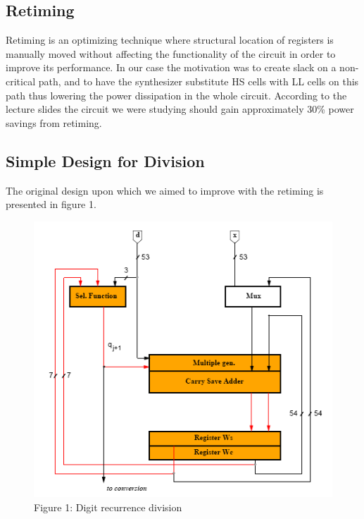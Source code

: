 \documentclass[11pt,a4paper]{article}
\begin{document}
\subsection{Retiming}
Retiming is an optimizing technique where structural location of registers is manually moved without affecting the functionality of the circuit in order to improve its performance. In our case the motivation was to create slack on a non-critical path, and to have the synthesizer substitute HS cells with LL cells on this path thus lowering the power dissipation in the whole circuit. According to the lecture slides the circuit we were studying should gain approximately 30\% power savings from retiming.

\subsection{Simple Design for Division}
The original design upon which we aimed to improve with the retiming is presented in figure 1.

\begin{figure}
	\centering
		\includegraphics{./noretiming.PNG}
	\caption{Figure 1: Digit recurrence division}
	\label{fig:noretiming}
\end{figure}
\end{document}
